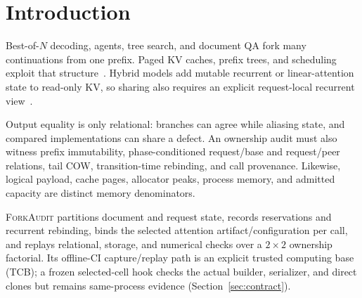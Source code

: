 \documentclass{article}
\newcommand{\method}{\textsc{ForkAudit}}
\begin{document}
\section{Introduction}
\label{sec:intro}

Best-of-$N$ decoding, agents, tree search, and document QA fork many
continuations from one prefix.  Paged KV caches, prefix trees, and scheduling
exploit that structure~\citep{kwon2023pagedattention,zheng2024sglang,
gim2024promptcache,srivatsa2025preble}.  Hybrid models add mutable recurrent or
linear-attention state to read-only KV, so sharing also requires an explicit
request-local recurrent view~\citep{yang2025gateddeltanet,lieber2025jamba,
pan2025marconi}.

Output equality is only relational: branches can agree while aliasing state,
and compared implementations can share a defect.  An ownership audit must also
witness prefix immutability, phase-conditioned request/base and request/peer
relations, tail COW, transition-time rebinding, and call provenance.  Likewise,
logical payload, cache pages, allocator peaks, process memory, and admitted
capacity are distinct memory denominators.

\method{} partitions document and request state, records reservations and
recurrent rebinding, binds the selected attention artifact/configuration per
call, and replays relational, storage, and numerical checks over a $2\times2$
ownership factorial.  Its offline-CI capture/replay path is an explicit trusted
computing base (TCB); a frozen selected-cell hook checks the actual builder,
serializer, and direct clones but remains same-process evidence
(Section~\ref{sec:contract}).
\end{document}
